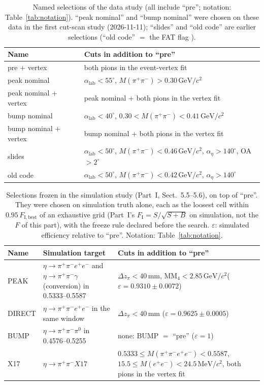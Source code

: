 \documentclass[11pt,a4paper]{article}
\newcommand{\piz}{\ensuremath{\pi^{0}}\xspace}
\newcommand{\pipi}{\ensuremath{\pi^{+}\pi^{-}}\xspace}
\newcommand{\ppee}{\ensuremath{\pi^{+}\pi^{-}e^{+}e^{-}}\xspace}
\newcommand{\Mfour}{\ensuremath{M(\pi^{+}\pi^{-}e^{+}e^{-})}\xspace}
\newcommand{\Mee}{\ensuremath{M(e^{+}e^{-})}\xspace}
\newcommand{\Mpipi}{\ensuremath{M(\pi^{+}\pi^{-})}\xspace}
\newcommand{\GeVcc}{\ensuremath{\mathrm{GeV}/c^{2}}\xspace}
\newcommand{\MeVcc}{\ensuremath{\mathrm{MeV}/c^{2}}\xspace}
\newcommand{\code}[1]{\texttt{\detokenize{#1}}}
\newcommand{\MMfour}{\ensuremath{\mathrm{MM}_4}\xspace}
\newcommand{\dzpi}{\ensuremath{\Delta z_\pi}\xspace}
\newcommand{\alab}{\ensuremath{\alpha_{\mathrm{lab}}}\xspace}
\newcommand{\aeta}{\ensuremath{\alpha_\eta}\xspace}
\begin{document}
\begin{table}[H]
\centering
\caption{Named selections of the data study (all include ``pre''; notation: Table~\ref{tab:notation}). ``peak
nominal'' and ``bump nominal'' were chosen on these data in the first cut-scan study (2026-11-11); ``slides'' and
``old code'' are earlier selections (``old code'' $=$ the FAT flag \code{sel_pass_cor}).}
\label{tab:named}
\small
\begin{tabularx}{\textwidth}{@{}>{\raggedright\arraybackslash}p{4.0cm} L@{}}
\toprule
Name & Cuts in addition to ``pre'' \\
\midrule
pre + vertex & both pions in the event-vertex fit \\
peak nominal & $\alab<55^\circ$, $\Mpipi>0.30$\,\GeVcc \\
peak nominal + vertex & peak nominal + both pions in the vertex fit \\
bump nominal & $\alab<40^\circ$, $0.30<\Mpipi<0.41$\,\GeVcc \\
bump nominal + vertex & bump nominal + both pions in the vertex fit \\
slides & $\alab<50^\circ$, $\Mpipi<0.46$\,\GeVcc, $\aeta>140^\circ$, OA$>2^\circ$ \\
old code & $\alab<50^\circ$, $\Mpipi<0.42$\,\GeVcc, $\aeta>140^\circ$ \\
\bottomrule
\end{tabularx}
\end{table}

\begin{table}[H]
\centering
\caption{Selections frozen in the simulation study (Part~I, Sect.~5.5--5.6), on top of ``pre''. They were
chosen on simulation truth alone, each as the loosest cell within $0.95\,F_{\mathrm{I,best}}$ of an exhaustive grid
(Part~I's $F_{\mathrm{I}}=S/\sqrt{S+B}$ on simulation, not the $F$ of this part),
with the freeze rule declared before the search. $\varepsilon$: simulated efficiency relative to ``pre''.
Notation: Table~\ref{tab:notation}.}
\label{tab:frozen}
\small
\begin{tabularx}{\textwidth}{@{}>{\raggedright\arraybackslash}p{1.6cm} >{\raggedright\arraybackslash}p{4.4cm} L@{}}
\toprule
Name & Simulation target & Cuts in addition to ``pre'' \\
\midrule
PEAK & $\eta\to\ppee$ and $\eta\to\pipi\gamma$ (conversion) in 0.5333--0.5587 & $\dzpi<40$\,mm, $\MMfour<2.85$\,\GeVcc ($\varepsilon=0.9310\pm0.0072$) \\
DIRECT & $\eta\to\ppee$ in the same window & $\dzpi<40$\,mm ($\varepsilon=0.9625\pm0.0005$) \\
BUMP & $\eta\to\pipi\piz$ in 0.4576--0.5255 & none: BUMP $=$ ``pre'' ($\varepsilon=1$) \\
X17 & $\eta\to\pipi X17$ & $0.5333\le\Mfour<0.5587$, $15.5\le\Mee<24.5$\,\MeVcc, both pions in the vertex fit \\
\bottomrule
\end{tabularx}
\end{table}
\end{document}
